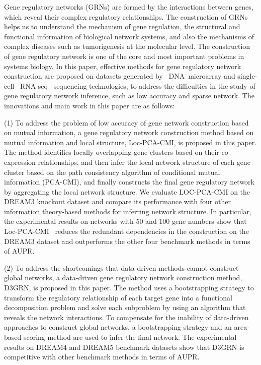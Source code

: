 \begin{abstracten}\setlength{\baselineskip}{20pt}

Gene regulatory networks (GRNs) are formed by the interactions between genes, 
which reveal their complex regulatory relationships. 
The construction of GRNs helps us to understand the mechanism of gene regulation, the structural and functional information of biological network systems, and also the mechanisms of complex diseases such as tumorigenesis at the molecular level.
The construction of gene regulatory network is one of the core and most important problems in systems biology.
In this paper, effective methods for gene regulatory network construction are proposed on datasets generated by ~DNA~microarray and single-cell ~RNA-seq~ sequencing technologies, 
to address  the difficulties in the study of gene regulatory network inference, such as low accuracy and sparse network.
The innovations and main work in this paper are as follows:

(1) To address the problem of low accuracy of gene network construction based on mutual information, 
a gene regulatory network construction method based on mutual information and local structure, Loc-PCA-CMI, is proposed in this paper. 
The method identifies locally overlapping gene clusters based on their co-expression relationships, and then infer the local network structure of each gene cluster based on the path consistency algorithm of conditional mutual information (PCA-CMI), 
and finally constructs the final gene regulatory network by aggregating the local network structure.
We evaluate LOC-PCA-CMI on the DREAM3 knockout dataset and compare its performance with four other information theory-based methods for inferring network structure.
In particular, the experimental results on networks with 50 and 100 gene numbers show that Loc-PCA-CMI~ reduces the redundant dependencies 
in the construction on the DREAM3 dataset and outperforms the other four benchmark methods in terms of AUPR.

(2) To address the shortcomings that data-driven methods cannot construct global networks, 
a data-driven gene regulatory network construction method, D3GRN, is proposed in this paper. 
The method uses a bootstrapping strategy to transform the regulatory relationship of each target gene into a functional decomposition problem and solve each subproblem by using an algorithm that reveals the network interactions. 
To compensate for the inability of data-driven approaches to construct global networks, 
a bootstrapping strategy and an area-based scoring method are used to infer the final network. 
The experimental results on DREAM4 and DREAM5 benchmark datasets show that D3GRN is competitive with other benchmark methods in terms of AUPR.



\end{abstracten}
